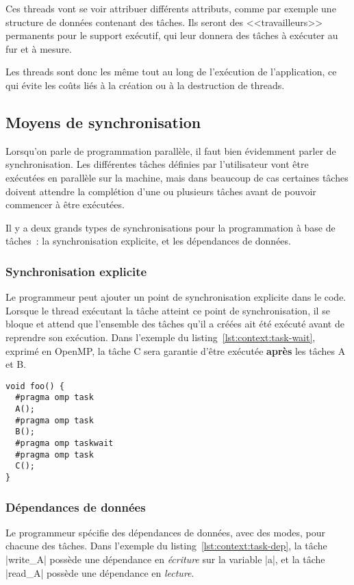 Ces threads vont se voir attribuer différents attributs, comme par exemple une structure de données contenant des tâches.
Ils seront des <<travailleurs>> permanents pour le support exécutif, qui leur donnera des tâches à exécuter au fur et à mesure.

Les threads sont donc les même tout au long de l'exécution de l'application, ce qui évite les coûts liés à la création ou à la destruction de threads. 


\subsection{Moyens de synchronisation}

Lorsqu'on parle de programmation parallèle, il faut bien évidemment parler de synchronisation.
Les différentes tâches définies par l'utilisateur vont être exécutées en parallèle sur la machine, mais dans beaucoup de cas certaines tâches doivent attendre la complétion d'une ou plusieurs tâches avant de pouvoir commencer à être exécutées.

Il y a deux grands types de synchronisations pour la programmation à base de tâches~: la synchronisation explicite, et les dépendances de données.

\subsubsection{Synchronisation explicite}

Le programmeur peut ajouter un point de synchronisation explicite dans le code.
Lorsque le thread exécutant la tâche atteint ce point de synchronisation, il se bloque et attend que l'ensemble des tâches qu'il a créées ait été exécuté avant de reprendre son exécution. Dans l'exemple du listing~\ref{lst:context:task-wait}, exprimé en OpenMP, la tâche C sera garantie d'être exécutée \textbf{après} les tâches A et B.

\begin{lstlisting}[caption=Synchronisation dans le thread courant (OpenMP),label=lst:context:task-wait]
void foo() {
  #pragma omp task
  A();
  #pragma omp task
  B();
  #pragma omp taskwait
  #pragma omp task
  C();
}
\end{lstlisting}


\subsubsection{Dépendances de données}

Le programmeur spécifie des dépendances de données, avec des modes, pour chacune des tâches.
Dans l'exemple du listing~\ref{lst:context:task-dep}, la tâche |write_A| possède une dépendance en \emph{écriture} sur la variable |a|, et la tâche |read_A| possède une dépendance en \emph{lecture}.

